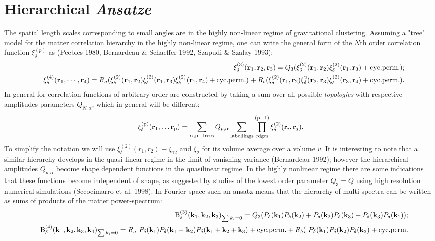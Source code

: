 \documentclass[usenatbib]{mn2e}
\def\ben{\begin{eqnarray}}
\def\een{\end{eqnarray}}
\def\ben{\begin{eqnarray}}
\def\een{\end{eqnarray}}
\begin{document}
\section{Hierarchical {\em Ansatze}}
%
The spatial length scales corresponding to
small angles are in the highly non-linear regime of gravitational clustering. Assuming a "tree" model 
for the matter correlation
hierarchy in the highly non-linear regime, one can write the 
general form of the $N$th order correlation function $\xi^{(p)}_{\delta}$ as 
(Peebles 1980, Bernardeau \& Schaeffer 1992, Szapudi \& Szalay 1993):
%
\ben
&& \xi^{(3)}_{\delta}( {\bf r}_1,{\bf r}_2, {\bf r}_3)= Q_3(\xi_{\delta}^{(2)}({\bf r}_1,{\bf r}_2)\xi_{\delta}^{(2)}({\bf r}_1,{\bf r}_3)+ {\rm cyc. perm.} );\\
&& \xi^{(4)}_{\delta}( {\bf r}_1,\cdots, {\bf r}_4)=
 R_a(\xi_{\delta}^{(2)}({\bf r}_1,{\bf r}_2)\xi_{\delta}^{(2)}({\bf r}_1,{\bf r}_3)\xi_{\delta}^{(2)}({\bf r}_1,{\bf r}_4)
+ {\rm cyc. perm.}) + R_b(\xi_{\delta}^{(2)}({\bf r}_1,{\bf r}_2)\xi_{\delta}^{2}({\bf r}_2,{\bf r}_3)\xi_{\delta}^{(2)}({\bf r}_3,{\bf r}_4)
+ {\rm cyc. perm.}).
\een
%
In general for correlation functions of arbitrary order are constructed by taking a sum over all possible {\em topologies} with
respective amplitudes parameters $Q_{N,\alpha}$, which in general will be different:
\begin{equation}
\xi^{({\rm p})}_{\delta}( {\bf r}_1, \dots {\bf r}_{\rm p} ) = \sum_{\alpha, \rm p-trees}
Q_{p,\alpha} \sum_{\rm labellings} \prod_{\rm edges}^{(\rm p-1)}
\xi^{(2)}_{\delta}({\bf r}_i, {\bf r}_j) .
\end{equation}
%
To simplify the notation we will use $\xi^{(2)}_{\delta}(r_1,r_2) \equiv \xi_{12}$ and $\bar\xi_2$ for its 
volume average over a volume $v$. It is interesting to note that a similar hierarchy 
develops in the quasi-linear regime in the limit of vanishing variance
(Bernardeau 1992); however the hierarchical amplitudes $Q_{p, \alpha}$
become shape dependent functions in the quasilinear regime. In the 
highly nonlinear 
regime there are some indications that these functions become
independent of shape, as suggested by studies of the
lowest order parameter $Q_3 = Q$ using high resolution numerical
simulations (Sccocimarro et al. 1998). In Fourier space such an
ansatz means that the hierarchy of multi-spectra 
can be written as sums of products of the matter power-spectrum:
%
\begin{eqnarray}
&&{\rm B}^{(3)}_{\delta}({\bf k}_1, {\bf k}_2, {\bf k}_3)_{\sum k_i = 0} = Q_3 ( P_{\delta}({\bf
k}_1)P_{\delta}({\bf k}_2) + P_{\delta}({\bf k}_2)P_{\delta}({\bf k}_3)
+ P_{\delta}({\bf k}_3)P_{\delta}({\bf k}_1) ) ;\\ 
&&{\rm B}^{(4)}_{\delta}({\bf k}_1, {\bf k}_2, {\bf k}_3, {\bf k}_4)_{\sum k_i = 0} = R_a
\ P_{\delta}({\bf k}_1)P_{\delta}({\bf k}_1 +
{\bf k}_2) P_{\delta}({\bf k}_1 + {\bf k}_2 + {\bf k}_3)  + {\rm cyc. perm.} + R_b(\ P_{\delta}(
{\bf k}_1)P_{\delta}({\bf k}_2)P_{\delta}({\bf k}_3) + 
{\rm cyc. perm.}
\end{eqnarray}
\end{document}
